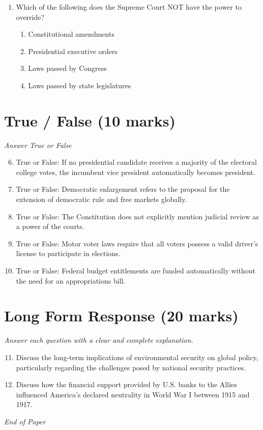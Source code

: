 \documentclass[12pt]{article}
\begin{document}
\begin{enumerate}[label=\arabic*.]
\begin{enumerate}[label=(\alph*)]
    \item A change in the nature of the defence trade, linked to the changing nature of conflict.
    \item All of these options.
\end{enumerate}
\item Which of the following does the Supreme Court NOT have the power to override?
\begin{enumerate}[label=(\alph*)]
    \item Constitutional amendments
    \item Presidential executive orders
    \item Laws passed by Congress
    \item Laws passed by state legislatures
\end{enumerate}
\end{enumerate}

\section*{True / False (10 marks)}
\textit{Answer True or False}
\begin{enumerate}[label=\arabic*.]
\setcounter{enumi}{5}
\item True or False: If no presidential candidate receives a majority of the electoral college votes, the incumbent vice president automatically becomes president.
\item True or False: Democratic enlargement refers to the proposal for the extension of democratic rule and free markets globally.
\item True or False: The Constitution does not explicitly mention judicial review as a power of the courts.
\item True or False: Motor voter laws require that all voters possess a valid driver's license to participate in elections.
\item True or False: Federal budget entitlements are funded automatically without the need for an appropriations bill.
\end{enumerate}

\section*{Long Form Response (20 marks)}
\textit{Answer each question with a clear and complete explanation.}
\begin{enumerate}[label=\arabic*.]
\setcounter{enumi}{10}
\item Discuss the long-term implications of environmental security on global policy, particularly regarding the challenges posed by national security practices.
\item Discuss how the financial support provided by U.S. banks to the Allies influenced America's declared neutrality in World War I between 1915 and 1917.
\end{enumerate}

\vfill
\noindent\textit{End of Paper}
\end{document}
